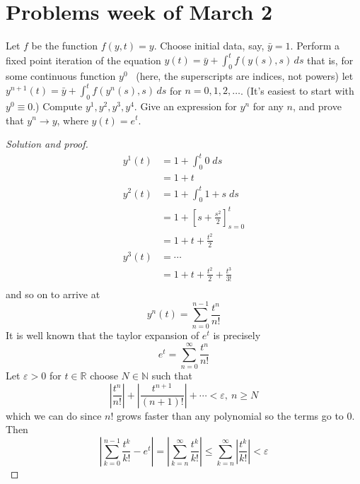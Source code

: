 \section{Problems week of March 2}
\begin{prob}
    Let $f$ be the function $f(y,t)=y$. 
    Choose initial data, say, $\bar y=1$. Perform a fixed point 
    iteration of the equation  
    $y(t) = \bar y + \int_0^t f(y(s),s)\,ds$  
    that is, for some continuous function $y^0$ 
    (here, the superscripts are indices, not powers) let  
    $y^{n+1}(t) = \bar y + \int_0^t f(y^n(s),s)\,ds$  
    for $n=0,1,2,\dots$. (It's easiest to start with $y^0\equiv0$.) 
    Compute $y^1,y^2,y^3,y^4$. Give an expression for $y^n$ 
    for any $n$, and prove that $y^n\to y$, where $y(t)=e^t$.
\end{prob}
\begin{proof}[Solution and proof]
    \begin{align*}
        y^1(t) &=  1 + \displaystyle\int_0^t 0 \; ds \\ 
        &= 1 + t \\ 
        y^2(t) &= 1 + \displaystyle\int_0^t 1 + s \; ds \\ 
        &= 1 + \left[s + \frac{s^2}{2}\right]_{s=0}^t \\ 
        &= 1 + t + \frac{t^2}{2} \\ 
        y^3(t) &= \cdots \\ 
        &= 1 + t + \frac{t^2}{2} + \frac{t^3}{3!} \\ 
    \end{align*}
    and so on to arrive at 
    \[
        y^n(t) = \displaystyle\sum_{n=0}^{n-1} \frac{t^n}{n!}
    \]
    It is well known that the taylor expansion of $e^t$ is 
    precisely 
    \[
        e^t = \displaystyle\sum_{n=0}^\infty \frac{t^n}{n!}
    \]
    Let $\varepsilon > 0$ for $t \in \mathbb R$ 
    choose $N \in \mathbb N$ such that 
    \[
        \left|\frac{t^n}{n!}\right| + 
        \left|\frac{t^{n+1}}{(n+1)!}\right| + \cdots 
                < \varepsilon, \: n \geq N
    \]
    which we can do since $n!$ grows faster than any polynomial so the
    terms go to $0$. 
    Then  
    \[
        \left|\displaystyle\sum_{k=0}^{n-1} \frac{t^k}{k!} - e^t
        \right|
        = \left|\displaystyle\sum_{k=n}^\infty \frac{t^k}{k!}
        \right| \leq 
        \displaystyle\sum_{k=n}^\infty \left|\frac{t^k}{k!}\right|
        < \varepsilon
    \]
\end{proof}

